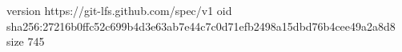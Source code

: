 version https://git-lfs.github.com/spec/v1
oid sha256:27216b0ffc52c699b4d3e63ab7e44c7c0d71efb2498a15dbd76b4cee49a2a8d8
size 745
